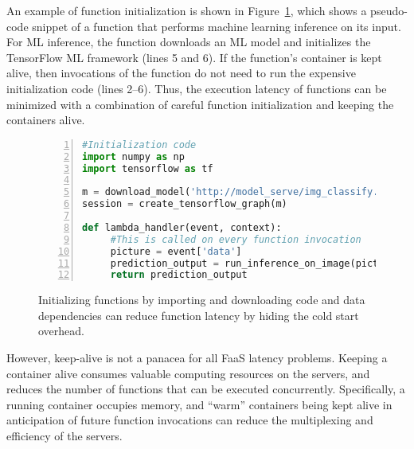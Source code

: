 An example of function initialization is shown in Figure~\ref{fig:lambda-example}, which shows a pseudo-code snippet of a function that performs machine learning inference on its input. 
For ML inference, the function downloads an ML model and initializes the TensorFlow ML framework (lines  5 and 6). 
If the function's container is kept alive, then invocations of the function do not need to run the expensive initialization code (lines 2--6). 
Thus, the execution latency of functions can be minimized with a combination of careful function  initialization and keeping the containers alive. 


\begin{figure}
\begin{lstlisting}[language=Python, numbers=left, frame=single, basicstyle=\sffamily, columns=fullflexible]
#Initialization code 
import numpy as np 
import tensorflow as tf
  
m = download_model('http://model_serve/img_classify.pb')
session = create_tensorflow_graph(m) 
  
def lambda_handler(event, context):
     #This is called on every function invocation 
     picture = event['data']
     prediction_output = run_inference_on_image(picture) 
     return prediction_output 
   \end{lstlisting}
   \vspace*{\myfigspace}
   \caption{Initializing functions by importing and downloading code and data dependencies can reduce function latency by hiding the cold start overhead.}
   \label{fig:lambda-example}
   \vspace*{\myfigspace}
\end{figure}


However, keep-alive is not a panacea for all FaaS latency problems. 
Keeping a container alive consumes valuable computing resources on the servers, and reduces the number of functions that can be executed concurrently. 
Specifically, a running container occupies memory, and ``warm'' containers being kept alive in anticipation of future function invocations can reduce the multiplexing and efficiency of the servers.

